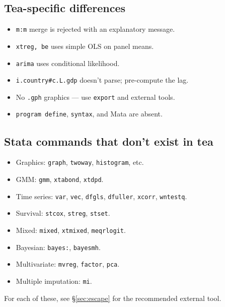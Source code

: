 \documentclass[11pt,letterpaper]{article}
\begin{document}
\subsection*{Tea-specific differences}

\begin{itemize}[leftmargin=*]
\item \texttt{m:m} merge is rejected with an explanatory message.
\item \texttt{xtreg, be} uses simple OLS on panel means.
\item \texttt{arima} uses conditional likelihood.
\item \texttt{i.country\#c.L.gdp} doesn't parse; pre-compute the lag.
\item No \texttt{.gph} graphics — use \texttt{export} and external tools.
\item \texttt{program define}, \texttt{syntax}, and Mata are absent.
\end{itemize}

\subsection*{Stata commands that don't exist in tea}

\begin{itemize}[leftmargin=*]
\item Graphics: \texttt{graph}, \texttt{twoway}, \texttt{histogram}, etc.
\item GMM: \texttt{gmm}, \texttt{xtabond}, \texttt{xtdpd}.
\item Time series: \texttt{var}, \texttt{vec}, \texttt{dfgls},
\texttt{dfuller}, \texttt{xcorr}, \texttt{wntestq}.
\item Survival: \texttt{stcox}, \texttt{streg}, \texttt{stset}.
\item Mixed: \texttt{mixed}, \texttt{xtmixed}, \texttt{meqrlogit}.
\item Bayesian: \texttt{bayes:}, \texttt{bayesmh}.
\item Multivariate: \texttt{mvreg}, \texttt{factor}, \texttt{pca}.
\item Multiple imputation: \texttt{mi}.
\end{itemize}

For each of these, see \S\ref{sec:escape} for the recommended external
tool.
\end{document}
